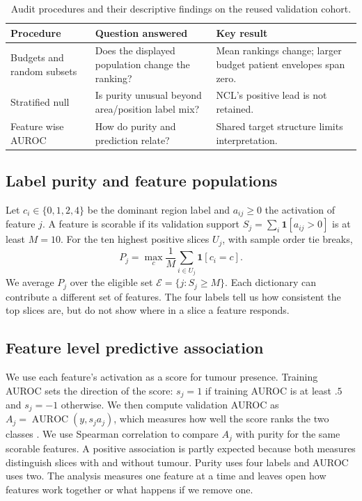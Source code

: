 \documentclass[letterpaper]{article}
\begin{document}
\begin{table}[t]
\centering\small
\begin{tabular}{@{}>{\raggedright\arraybackslash}p{.77in}>{\raggedright\arraybackslash}p{.97in}>{\raggedright\arraybackslash}p{1.03in}@{}}
\toprule
Procedure & Question answered & Key result\\\midrule
Budgets and random subsets & Does the displayed population change the ranking? & Mean rankings change; larger budget patient envelopes span zero.\\
Stratified null & Is purity unusual beyond area/position label mix? & NCL's positive lead is not retained.\\
Feature wise AUROC & How do purity and prediction relate? & Shared target structure limits interpretation.\\
\bottomrule
\end{tabular}
\caption{Audit procedures and their descriptive findings on the reused validation cohort.}
\label{tab:procedures}
\end{table}

\subsection{Label purity and feature populations}
Let $c_i\in\{0,1,2,4\}$ be the dominant region label and $a_{ij}\geq0$ the activation of feature $j$. A feature is scorable if its validation support $S_j=\sum_i\mathbf1[a_{ij}>0]$ is at least $M=10$. For the ten highest positive slices $U_j$, with sample order tie breaks,
\begin{equation}
 P_j=\max_c\frac1M\sum_{i\in U_j}\mathbf1[c_i=c].
\label{eq:purity}
\end{equation}
We average $P_j$ over the eligible set $\mathcal E=\{j:S_j\geq M\}$. Each dictionary can contribute a different set of features. The four labels tell us how consistent the top slices are, but do not show where in a slice a feature responds.

\subsection{Feature level predictive association}
We use each feature's activation as a score for tumour presence. Training AUROC sets the direction of the score: $s_j=1$ if training AUROC is at least $.5$ and $s_j=-1$ otherwise. We then compute validation AUROC as $A_j=\operatorname{AUROC}(y,s_ja_j)$, which measures how well the score ranks the two classes \cite{hanley1982auc}. We use Spearman correlation \cite{spearman1904association} to compare $A_j$ with purity for the same scorable features. A positive association is partly expected because both measures distinguish slices with and without tumour. Purity uses four labels and AUROC uses two. The analysis measures one feature at a time and leaves open how features work together or what happens if we remove one.
\end{document}
